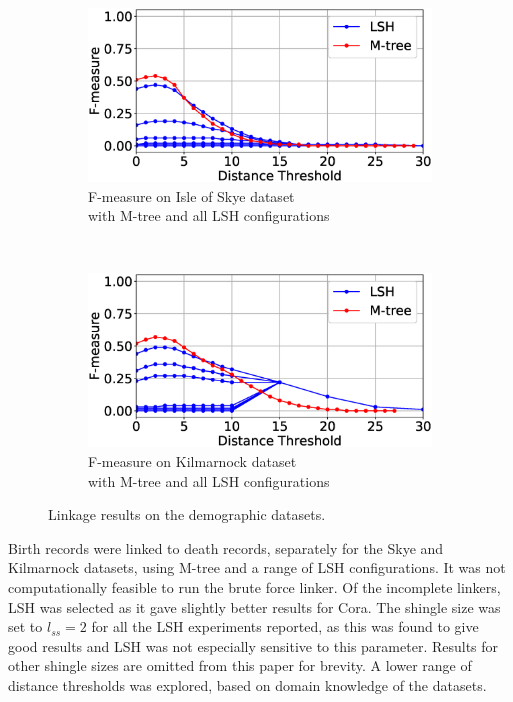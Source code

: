 \documentclass{llncs}
\begin{document}
\begin{figure}[t]
\begin{subfigure}{.47\textwidth}
  \centering
\includegraphics[width=\textwidth]{figures/plotFs-skye-f}
\vspace{-6mm}
\caption{F-measure on Isle of Skye dataset \\ with M-tree and all
LSH configurations}
\end{subfigure}%
~~
\begin{subfigure}{.47\textwidth}
  \centering
\includegraphics[width=\textwidth]{figures/plotFs-kilmarnock-f}
\vspace{-6mm}
\caption{F-measure on Kilmarnock dataset \\ with M-tree and all LSH configurations}
\end{subfigure}
\caption{Linkage results on the demographic datasets.}
\label{demography-quality}
\end{figure}

Birth records were linked to death records, separately for the Skye and
Kilmarnock datasets, using M-tree and a range of LSH configurations. It
was not computationally feasible to run the brute force linker. Of the
incomplete linkers, LSH was selected as it gave slightly better results
for Cora. The shingle size was set to $l_{ss}=2$ for all the LSH
experiments reported, as this was found to give good results and LSH
was not especially sensitive to this parameter. Results for other
shingle sizes are omitted from this paper for brevity. A lower range
of distance thresholds was explored, based on domain knowledge of the
datasets.
\end{document}

